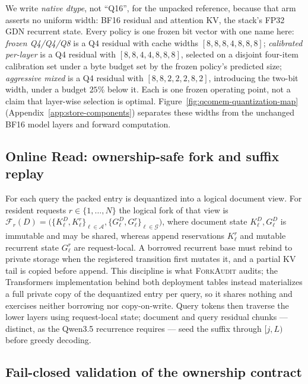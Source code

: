 \documentclass{article}
\newcommand{\method}{\textsc{ForkAudit}}
\begin{document}
We write \emph{native dtype}, not ``Q16'', for the unpacked reference, because
that arm asserts no uniform width: BF16 residual and attention KV, the stack's
FP32 GDN recurrent state.  Every policy is one frozen bit vector with one name
here: \emph{frozen Q4/Q4/Q8} is a Q4 residual with cache widths $[8,8,8,4,8,8,8]$; \emph{calibrated per-layer} is a Q4 residual with
$[8,8,4,4,8,8,8]$, selected on a disjoint four-item calibration set under a byte
budget set by the frozen policy's predicted size; \emph{aggressive mixed} is a
Q4 residual with $[8,8,2,2,2,8,2]$, introducing the two-bit width, under a
budget $25\%$ below it.  Each is one frozen operating point, not a claim that
layer-wise selection is optimal.  Figure~\ref{fig:qcomem-quantization-map}
(Appendix~\ref{app:store-components}) separates these widths from the unchanged
BF16 model layers and forward computation.

\subsection{Online Read: ownership-safe fork and suffix replay}
\label{sec:read}

For each query the packed entry is dequantized into a logical document view.
For resident requests \(r\in\{1,\ldots,N\}\) the logical fork of that view is
\(\mathcal{F}_r(D)=\bigl(\{K^D_\ell,K^r_\ell\}_{\ell\in\mathcal A},
\{G^D_\ell,G^r_\ell\}_{\ell\in\mathcal G}\bigr)\), where document state
\(K^D_\ell,G^D_\ell\) is immutable and may be shared, whereas append
reservations \(K^r_\ell\) and mutable recurrent state \(G^r_\ell\) are
request-local. A borrowed recurrent base must rebind to private storage when
the registered transition first mutates it, and a partial KV tail is copied
before append. This discipline is what \method{} audits; the Transformers
implementation behind both deployment tables instead materializes a full
private copy of the dequantized entry per query, so it shares nothing and
exercises neither borrowing nor copy-on-write. Query tokens then traverse the
lower layers using request-local state; document and query residual chunks ---
distinct, as the Qwen3.5 recurrence requires --- seed the suffix through
$[j,L)$ before greedy decoding.

\subsection{Fail-closed validation of the ownership contract}
\label{sec:contract}
\end{document}
